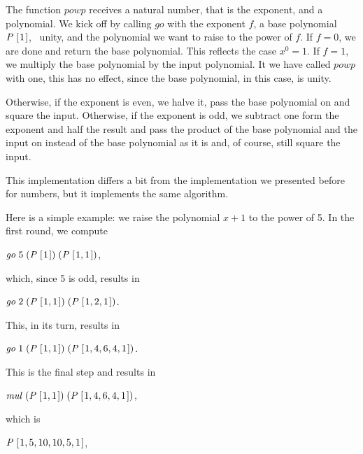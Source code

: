 \documentclass[tikz]{scrreprt}
\newcommand{\Conid}[1]{\mathit{#1}}
\newcommand{\Varid}[1]{\mathit{#1}}
\begin{document}
The function \ensuremath{\Varid{powp}} receives a natural number,
that is the exponent, and a polynomial.
We kick off by calling \ensuremath{\Varid{go}} with the exponent $f$,
a base polynomial \ensuremath{\Conid{P}\;[\mskip1.5mu \mathrm{1}\mskip1.5mu]}, \ie\ unity, and the polynomial
we want to raise to the power of \ensuremath{\Varid{f}}.
If $f=0$, we are done and return the base polynomial.
This reflects the case $x^0=1$.
If $f=1$, we multiply the base polynomial by the input polynomial.
It we have called \ensuremath{\Varid{powp}} with one, this has no effect,
since the base polynomial, in this case, is unity.

Otherwise, if the exponent is even,
we halve it, pass the base polynomial on and square the input.
Otherwise, if the exponent is odd,
we subtract one form the exponent and half the result
and pass the product of the base polynomial and the input
on instead of the base polynomial as it is and,
of course, still square the input.

This implementation differs a bit from the implementation
we presented before for numbers, but it implements the same
algorithm.

Here is a simple example: we raise the polynomial
$x + 1$ to the power of 5. In the first round, we compute

\ensuremath{\Varid{go}\;\mathrm{5}\;(\Conid{P}\;[\mskip1.5mu \mathrm{1}\mskip1.5mu])\;(\Conid{P}\;[\mskip1.5mu \mathrm{1},\mathrm{1}\mskip1.5mu])},

which, since 5 is odd, results in 

\ensuremath{\Varid{go}\;\mathrm{2}\;(\Conid{P}\;[\mskip1.5mu \mathrm{1},\mathrm{1}\mskip1.5mu])\;(\Conid{P}\;[\mskip1.5mu \mathrm{1},\mathrm{2},\mathrm{1}\mskip1.5mu])}.

This, in its turn, results in

\ensuremath{\Varid{go}\;\mathrm{1}\;(\Conid{P}\;[\mskip1.5mu \mathrm{1},\mathrm{1}\mskip1.5mu])\;(\Conid{P}\;[\mskip1.5mu \mathrm{1},\mathrm{4},\mathrm{6},\mathrm{4},\mathrm{1}\mskip1.5mu])}.

This is the final step and results in 

\ensuremath{\Varid{mul}\;(\Conid{P}\;[\mskip1.5mu \mathrm{1},\mathrm{1}\mskip1.5mu])\;(\Conid{P}\;[\mskip1.5mu \mathrm{1},\mathrm{4},\mathrm{6},\mathrm{4},\mathrm{1}\mskip1.5mu])}, 

which is

\ensuremath{\Conid{P}\;[\mskip1.5mu \mathrm{1},\mathrm{5},\mathrm{10},\mathrm{10},\mathrm{5},\mathrm{1}\mskip1.5mu]},
\end{document}
